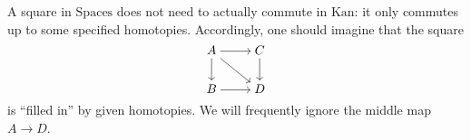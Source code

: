 \documentclass[../notes.tex]{subfiles}
\begin{document}
\begin{remark}
	A square in $\mathrm{Spaces}$ does not need to actually commute in $\mathrm{Kan}$: it only commutes up to some specified homotopies. Accordingly, one should imagine that the square
	\[\begin{tikzcd}[cramped]
		A & C \\
		B & D
		\arrow[from=1-1, to=1-2]
		\arrow[from=1-1, to=2-1]
		\arrow[from=1-1, to=2-2]
		\arrow[from=1-2, to=2-2]
		\arrow[from=2-1, to=2-2]
	\end{tikzcd}\]
	is ``filled in'' by given homotopies. We will frequently ignore the middle map $A\to D$.
\end{remark}
\end{document}
